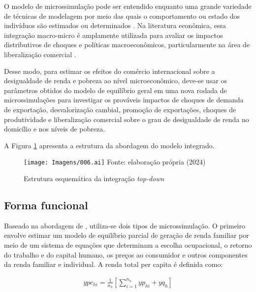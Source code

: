 O modelo de microssimulação pode ser entendido enquanto uma grande variedade de técnicas de modelagem por meio das quais o comportamento ou estado dos indivíduos são estimados ou determinados \cite{figari15}. Na literatura econômica, essa integração macro-micro é amplamente utilizada para avaliar os impactos distributivos de choques e políticas macroeconômicos, particularmente
na área de liberalização comercial \cite{carneiro06, ferreira06, raihan10, cicowiez16, mbanda21}.

Desse modo, para estimar os efeitos do comércio internacional sobre a desigualdade de renda e pobreza ao nível microeconômico, deve-se usar os parâmetros obtidos do modelo de equilíbrio geral em uma nova rodada de microssimulações para investigar os prováveis impactos de choques de demanda de exportação, desvalorização cambial, promoção de exportações, choques de produtividade e liberalização comercial sobre o grau de desigualdade de renda no domicílio e nos níveis de pobreza.

A Figura \ref{fig:microssimulacao} apresenta a estrutura da abordagem do modelo integrado.

\begin{landscape}
	\begin{figure}
		\centering
		\caption{Estrutura esquemática da integração \textit{top-down}} \label{fig:microssimulacao}
		\texttt{[image: Imagens/006.ai]}
		\footnotesize
		Fonte: elaboração própria (2024)
	\end{figure}
\end{landscape}

\subsection{Forma funcional} \label{subsec:forma_funcional}
 
Baseado na abordagem de \textcite{ganuza07}, utiliza-se dois tipos de microssimulação. O primeiro envolve estimar um modelo de equilíbrio parcial de geração de renda familiar por meio de um sistema de equações que determinam a escolha ocupacional, o retorno do trabalho e do capital humano, os preços ao consumidor e outros componentes da renda familiar e individual. A renda total per capita é definida como:

\begin{align}
	ypc_{hi} = \frac{1}{n_h} \left[ \sum_{i = 1}^{n_h} yp_{hi} + yq_h \right] \label{eq:renda}
\end{align}

